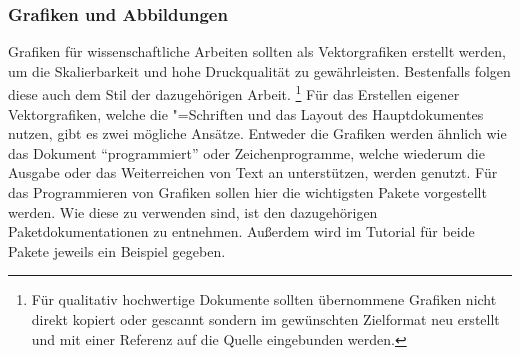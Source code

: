 \subsubsection{Grafiken und Abbildungen}
%
%
Grafiken für wissenschaftliche Arbeiten sollten als Vektorgrafiken erstellt 
werden, um die Skalierbarkeit und hohe Druckqualität zu gewährleisten. 
Bestenfalls folgen diese auch dem Stil der dazugehörigen Arbeit.%
\footnote{%
  Für qualitativ hochwertige Dokumente sollten übernommene Grafiken nicht 
  direkt kopiert oder gescannt sondern im gewünschten Zielformat neu erstellt 
  und mit einer Referenz auf die Quelle eingebunden werden.%
}
Für das Erstellen eigener Vektorgrafiken, welche die "=Schriften 
und das Layout des Hauptdokumentes nutzen, gibt es zwei mögliche Ansätze. 
Entweder die Grafiken werden ähnlich wie das Dokument \enquote{programmiert} 
oder Zeichenprogramme, welche wiederum die Ausgabe oder das Weiterreichen von 
Text an  unterstützen, werden genutzt. Für das Programmieren 
von Grafiken sollen hier die wichtigsten Pakete vorgestellt werden. Wie diese 
zu verwenden sind, ist den dazugehörigen Paketdokumentationen zu entnehmen. 
Außerdem wird im Tutorial  für beide Pakete jeweils ein 
Beispiel gegeben.


